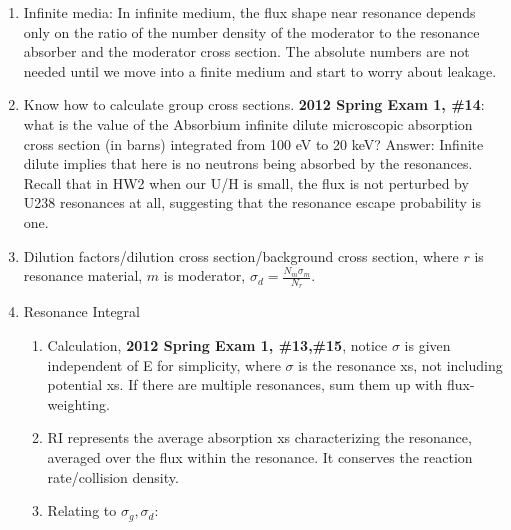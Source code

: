 \documentclass{school-22.211-notes}
\begin{document}
\clearpage
{}
  \begin{enumerate}
    \item Infinite media: In infinite medium, the flux shape near resonance depends only on the ratio of the number density of the moderator to the resonance absorber and the moderator cross section. The absolute numbers are not needed until we move into a finite medium and start to worry about leakage. 

    \item Know how to calculate group cross sections. \textbf{2012 Spring Exam 1, \#14}: what is the value of the Absorbium infinite dilute microscopic absorption cross section (in barns) integrated from 100 eV to 20 keV? Answer: 
      Infinite dilute implies that here is no neutrons being absorbed by the resonances. Recall that in HW2 when our U/H is small, the flux is not perturbed by U238 resonances at all, suggesting that the resonance escape probability is one.

    \item Dilution factors/dilution cross section/background cross section, where $r$ is resonance material, $m$ is moderator, $ \displaystyle \boxed{\sigma_d = \frac{N_m \sigma_m}{N_r} }$. 

    \item Resonance Integral
      \begin{enumerate}
      \item Calculation, \textbf{2012 Spring Exam 1, \#13,\#15}, notice $\sigma$ is given independent of E for simplicity,
        where $\sigma$ is the resonance xs, not including potential xs. If there are multiple resonances, sum them up with flux-weighting. 

      \item RI represents the average absorption xs characterizing the resonance, averaged over the flux within the resonance. It conserves the reaction rate/collision density. 
        
      \item Relating to $\sigma_g, \sigma_d$: 


\end{enumerate}
\end{enumerate}
\end{document}
